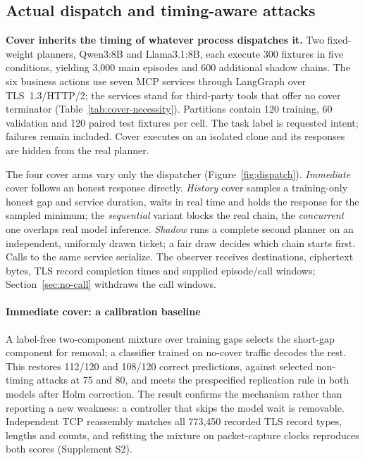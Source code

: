 \subsection{Actual dispatch and timing-aware attacks}\label{sec:cover-study}
\textbf{Cover inherits the timing of whatever process dispatches it.}
Two fixed-weight planners, Qwen3:8B and Llama3.1:8B, each execute 300 fixtures in five conditions, yielding 3,000 main episodes and 600 additional shadow chains. The six business actions use seven MCP services through LangGraph over TLS~1.3/HTTP/2; the services stand for third-party tools that offer no cover terminator (Table~\ref{tab:cover-necessity}). Partitions contain 120 training, 60 validation and 120 paired test fixtures per cell. The task label is requested intent; failures remain included. Cover executes on an isolated clone and its responses are hidden from the real planner.

The four cover arms vary only the dispatcher (Figure~\ref{fig:dispatch}). \emph{Immediate} cover follows an honest response directly. \emph{History} cover samples a training-only honest gap and service duration, waits in real time and holds the response for the sampled minimum; the \emph{sequential} variant blocks the real chain, the \emph{concurrent} one overlaps real model inference. \emph{Shadow} runs a complete second planner on an independent, uniformly drawn ticket; a fair draw decides which chain starts first. Calls to the same service serialize. The observer receives destinations, ciphertext bytes, TLS record completion times and supplied episode/call windows; Section~\ref{sec:no-call} withdraws the call windows.



\paragraph{Immediate cover: a calibration baseline}
A label-free two-component mixture over training gaps selects the short-gap component for removal; a classifier trained on no-cover traffic decodes the rest. This restores 112/120 and 108/120 correct predictions, against selected non-timing attacks at 75 and 80, and meets the prespecified replication rule in both models after Holm correction. The result confirms the mechanism rather than reporting a new weakness: a controller that skips the model wait is removable. Independent TCP reassembly matches all 773,450 recorded TLS record types, lengths and counts, and refitting the mixture on packet-capture clocks reproduces both scores (Supplement S2).

